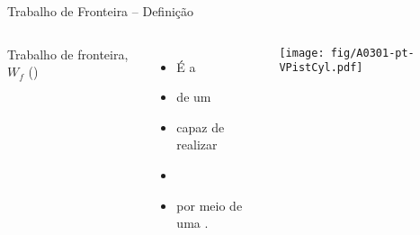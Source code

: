     \begin{frame}{Trabalho de Fronteira -- Definição}\vspace*{-2em}
        \begin{columns}
        Trabalho de fronteira, $W_f$ (\kilo\joule)                          \\[\medskipamount]
        \begin{itemize}
            \item É a                           \\[\medskipamount]
            \item de um                  \\[\medskipamount]
            \item capaz de  realizar                      \\[\medskipamount]
            \item {}                                  \\[\medskipamount]
            \item por meio de uma .
        \end{itemize}
        \texttt{[image: fig/A0301-pt-VPistCyl.pdf]}
        \end{columns}
    \end{frame}


